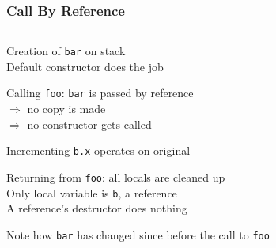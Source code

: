 \begin{frame}
  \frametitle{Call By Reference}
  \begin{center}
    \begin{columns}
      \column{4cm}
      \column{4cm}
    \end{columns}
  \end{center}
  \vskip2mm
  \begin{overprint}
    \begin{center}
      Creation of {\tt bar} on stack \\
      Default constructor does the job
    \end{center}

    \begin{center}
      Calling {\tt foo}: {\tt bar} is passed by reference \\
      $\Rightarrow$ no copy is made \\
      $\Rightarrow$ no constructor gets called
    \end{center}

    \begin{center}
      Incrementing {\tt b.x} operates on original
    \end{center}

    \begin{center}
      Returning from {\tt foo}: all locals are cleaned up \\
      Only local variable is {\tt b}, a reference \\
      A reference's destructor does nothing
    \end{center}

    \begin{center}
      Note how {\tt bar} has changed since before the call to {\tt foo}
    \end{center}
  \end{overprint}
\end{frame}



